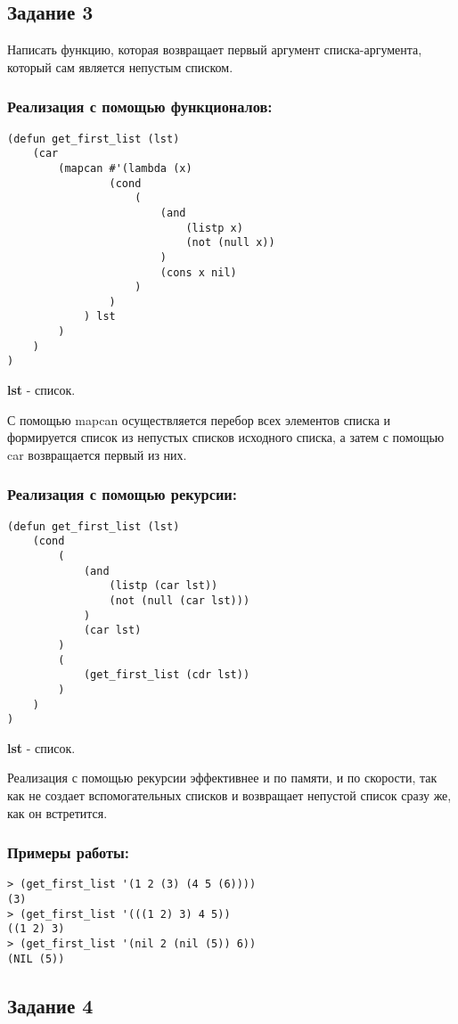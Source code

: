 \documentclass[a4paper,12pt]{article}
\begin{document}
\subsection*{Задание 3}

Написать функцию, которая возвращает первый аргумент списка-аргумента, который сам является непустым списком.

\subsubsection*{Реализация с помощью функционалов:}
\begin{lstlisting}[caption=Функция поиска первого непустого списка]
(defun get_first_list (lst)
	(car 
		(mapcan #'(lambda (x)
				(cond
					(
						(and	
							(listp x)
							(not (null x))
						)
						(cons x nil)
					)
				)
			) lst
		)
	)
)
\end{lstlisting}
\textbf{lst} - список.

С помощью mapcan осуществляется перебор всех элементов списка и формируется список из непустых списков исходного списка, а затем с помощью car возвращается первый из них.

\subsubsection*{Реализация с помощью рекурсии:}
\begin{lstlisting}[caption=Функция поиска первого непустого списка]
(defun get_first_list (lst)
	(cond	
		(
			(and	
				(listp (car lst))
				(not (null (car lst)))
			)
			(car lst)
		)
		(
			(get_first_list (cdr lst))
		)
	)
)
\end{lstlisting}
\textbf{lst} - список.

Реализация с помощью рекурсии эффективнее и по памяти, и по скорости, так как не создает вспомогательных списков и возвращает непустой список сразу же, как он встретится.

\subsubsection*{Примеры работы:}
\begin{lstlisting}
> (get_first_list '(1 2 (3) (4 5 (6))))
(3)
> (get_first_list '(((1 2) 3) 4 5))
((1 2) 3)
> (get_first_list '(nil 2 (nil (5)) 6))
(NIL (5))
\end{lstlisting}

\subsection*{Задание 4}
\end{document}
